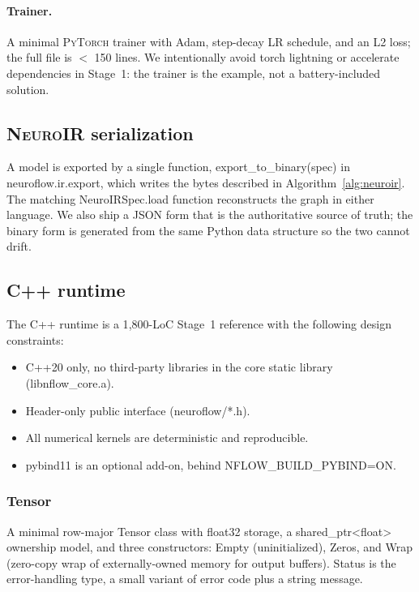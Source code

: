 \documentclass[10pt,twocolumn]{article}
\renewcommand{\texttt}[1]{{\normalfont\ttfamily #1}\normalfont\rmfamily}
\newcommand{\neuroir}{\textsc{NeuroIR}}
\newcommand{\py}{\textsc{PyTorch}}
\begin{document}
\paragraph{Trainer.}
A minimal \py{} trainer with Adam, step-decay LR schedule, and an
L2 loss; the full file is $<$ 150 lines.  We intentionally avoid
\texttt{torch lightning} or \texttt{accelerate} dependencies in
Stage~1: the trainer is the example, not a battery-included
solution.

\subsection{\neuroir{} serialization}

A model is exported by a single function,
\texttt{export\_to\_binary(spec)} in \texttt{neuroflow.ir.export},
which writes the bytes described in Algorithm~\ref{alg:neuroir}.
The matching \texttt{NeuroIRSpec.load} function reconstructs the
graph in either language.  We also ship a JSON form that is the
authoritative source of truth; the binary form is generated from
the same Python data structure so the two cannot drift.

\subsection{C{++} runtime}

The C{++} runtime is a 1{,}800-LoC Stage~1 reference with the
following design constraints:
\begin{itemize}[leftmargin=*,itemsep=1pt,topsep=2pt]
  \item C{++}20 only, no third-party libraries in the core static
  library (\texttt{libnflow\_core.a}).
  \item Header-only public interface (\texttt{neuroflow/*.h}).
  \item All numerical kernels are deterministic and reproducible.
  \item pybind11 is an optional add-on, behind
  \texttt{NFLOW\_BUILD\_PYBIND=ON}.
\end{itemize}

\subsubsection{Tensor}

A minimal row-major \texttt{Tensor} class with float32 storage, a
\texttt{shared\_ptr<float>} ownership model, and three
constructors: \texttt{Empty} (uninitialized), \texttt{Zeros}, and
\texttt{Wrap} (zero-copy wrap of externally-owned memory for
output buffers).  \texttt{Status} is the error-handling type, a
small \texttt{variant} of error code plus a string message.
\end{document}
